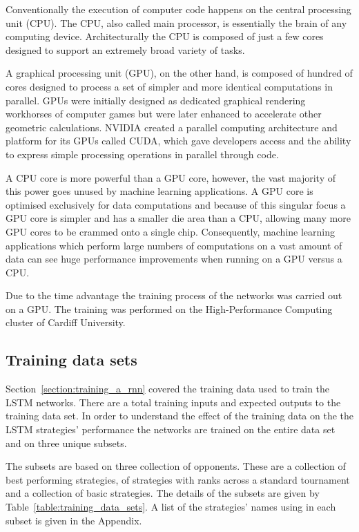 Conventionally the execution of computer code happens on the central processing unit
(CPU). The CPU, also called main processor, is essentially the brain of any
computing device. Architecturally the CPU is composed of just a few cores
designed to support an extremely broad variety of tasks.

A graphical processing unit (GPU), on the other hand, is composed of hundred of
cores designed to process a set of simpler and more identical computations in
parallel. GPUs were initially designed as dedicated graphical rendering
workhorses of computer games but were later enhanced to accelerate other
geometric calculations. NVIDIA created a parallel computing architecture and
platform for its GPUs called CUDA, which gave developers access and the ability
to express simple processing operations in parallel through code.

A CPU core is more powerful than a GPU core, however, the vast majority of this
power goes unused by machine learning applications. A GPU core is optimised
exclusively for data computations and because of this singular focus a GPU core
is simpler and has a smaller die area than a CPU, allowing many more GPU cores
to be crammed onto a single chip. Consequently, machine learning applications
which perform large numbers of computations on a vast amount of data can see
huge performance improvements when running on a GPU versus a CPU.

Due to the time advantage the training process of the networks was carried out
on a GPU. The training was performed on the High-Performance Computing
cluster of Cardiff University.

\subsection{Training data sets}

Section~\ref{section:training_a_rnn} covered the training data used to train
the LSTM networks. There are a total \trainingpoint training inputs and expected
outputs to the training data set. In order to understand the effect of
the training data on the the LSTM strategies' performance the networks are trained
on the entire data set and on three unique subsets.

The subsets are based on three collection of opponents. These are a collection
of best performing strategies, of strategies with ranks across a standard
tournament and a collection of basic strategies. The details of the subsets are
given by Table~\ref{table:training_data_sets}.
A list of the strategies' names using in each subset is given in the Appendix. %

